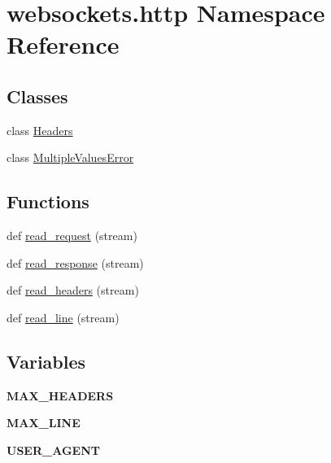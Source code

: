 \hypertarget{namespacewebsockets_1_1http}{}\section{websockets.\+http Namespace Reference}
\label{namespacewebsockets_1_1http}
\subsection*{Classes}
\begin{DoxyCompactItemize}
\item 
class \hyperlink{classwebsockets_1_1http_1_1_headers}{Headers}
\item 
class \hyperlink{classwebsockets_1_1http_1_1_multiple_values_error}{Multiple\+Values\+Error}
\end{DoxyCompactItemize}
\subsection*{Functions}
\begin{DoxyCompactItemize}
\item 
def \hyperlink{namespacewebsockets_1_1http_aa060b2ffb58150775d151cfa7ac3e276}{read\+\_\+request} (stream)
\item 
def \hyperlink{namespacewebsockets_1_1http_a4a2fa59574c998f90999402c995c0a1b}{read\+\_\+response} (stream)
\item 
def \hyperlink{namespacewebsockets_1_1http_a75fb58c62ddc81487e554a7798931adc}{read\+\_\+headers} (stream)
\item 
def \hyperlink{namespacewebsockets_1_1http_a0d3f313afb171e8b73c34410509e6ec1}{read\+\_\+line} (stream)
\end{DoxyCompactItemize}
\subsection*{Variables}
\begin{DoxyCompactItemize}
\item 
\mbox{\label{namespacewebsockets_1_1http_a4fc348f90372785b400f4ca4fd9a6bd2}} 
{\bfseries M\+A\+X\+\_\+\+H\+E\+A\+D\+E\+RS}
\item 
\mbox{\label{namespacewebsockets_1_1http_a7daadd7833770af7f7659150c5b5761e}} 
{\bfseries M\+A\+X\+\_\+\+L\+I\+NE}
\item 
\mbox{\label{namespacewebsockets_1_1http_a55f8f26a6de556349f1b0fb1769357e5}} 
{\bfseries U\+S\+E\+R\+\_\+\+A\+G\+E\+NT}
\end{DoxyCompactItemize}


